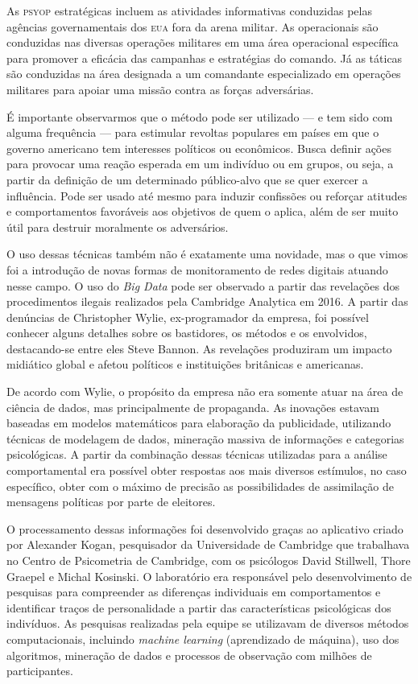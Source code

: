 As \textsc{psyop} estratégicas incluem as atividades informativas conduzidas
pelas agências governamentais dos \textsc{eua} fora da arena militar. As
operacionais são conduzidas nas diversas operações militares em uma área
operacional específica para promover a eficácia das campanhas e
estratégias do comando. Já as táticas são conduzidas na área designada a
um comandante especializado em operações militares para apoiar uma
missão contra as forças adversárias.

É importante observarmos que o método pode ser utilizado --- e tem sido
com alguma frequência --- para estimular revoltas populares em países em
que o governo americano tem interesses políticos ou econômicos. Busca
definir ações para provocar uma reação esperada em um indivíduo ou em
grupos, ou seja, a partir da definição de um determinado público-alvo
que se quer exercer a influência. Pode ser usado até mesmo para induzir
confissões ou reforçar atitudes e comportamentos favoráveis aos
objetivos de quem o aplica, além de ser muito útil para destruir
moralmente os adversários.

O uso dessas técnicas também não é exatamente uma novidade, mas o que
vimos foi a introdução de novas formas de monitoramento de redes
digitais atuando nesse campo. O uso do \textit{Big Data} pode ser observado a
partir das revelações dos procedimentos ilegais realizados pela
Cambridge Analytica em 2016. A partir das denúncias de Christopher
Wylie, ex-programador da empresa, foi possível conhecer alguns detalhes
sobre os bastidores, os métodos e os envolvidos, destacando-se entre
eles Steve Bannon. As revelações produziram um impacto midiático global
e afetou políticos e instituições britânicas e americanas.

De acordo com Wylie, o propósito da empresa não era somente atuar na
área de ciência de dados, mas principalmente de propaganda. As inovações
estavam baseadas em modelos matemáticos para elaboração da publicidade,
utilizando técnicas de modelagem de dados, mineração massiva de
informações e categorias psicológicas. A partir da combinação dessas
técnicas utilizadas para a análise comportamental era possível obter
respostas aos mais diversos estímulos, no caso específico, obter com o
máximo de precisão as possibilidades de assimilação de mensagens
políticas por parte de eleitores.

O processamento dessas informações foi desenvolvido graças ao aplicativo
criado por Alexander Kogan, pesquisador da Universidade de Cambridge que
trabalhava no Centro de Psicometria de Cambridge, com os psicólogos
David Stillwell, Thore Graepel e Michal Kosinski. O laboratório era
responsável pelo desenvolvimento de pesquisas para compreender as
diferenças individuais em comportamentos e identificar traços de
personalidade a partir das características psicológicas dos indivíduos.
As pesquisas realizadas pela equipe se utilizavam de diversos métodos
computacionais, incluindo \textit{machine learning} (aprendizado de máquina), uso
dos algoritmos, mineração de dados e processos de observação com milhões
de participantes.

